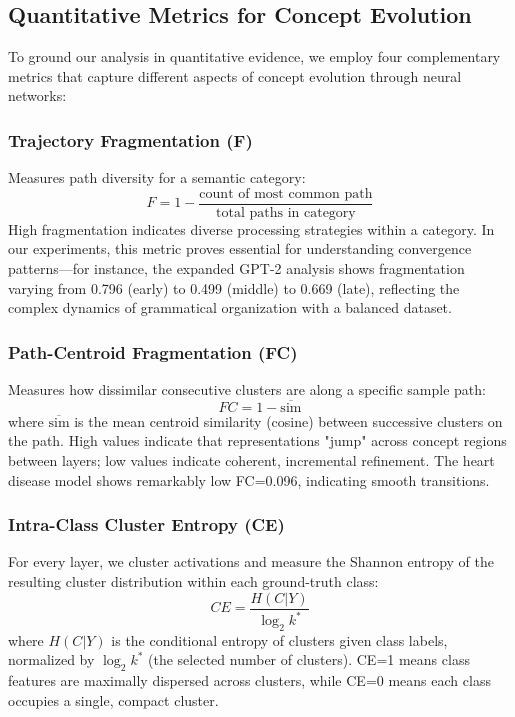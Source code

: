 \subsection{Quantitative Metrics for Concept Evolution}

To ground our analysis in quantitative evidence, we employ four complementary metrics that capture different aspects of concept evolution through neural networks:

\subsubsection{Trajectory Fragmentation (F)}
Measures path diversity for a semantic category:
$$F = 1 - \frac{\text{count of most common path}}{\text{total paths in category}}$$
High fragmentation indicates diverse processing strategies within a category. In our experiments, this metric proves essential for understanding convergence patterns—for instance, the expanded GPT-2 analysis shows fragmentation varying from 0.796 (early) to 0.499 (middle) to 0.669 (late), reflecting the complex dynamics of grammatical organization with a balanced dataset.

\subsubsection{Path-Centroid Fragmentation (FC)}
Measures how dissimilar consecutive clusters are along a specific sample path:
$$FC = 1 - \overline{\text{sim}}$$
where $\overline{\text{sim}}$ is the mean centroid similarity (cosine) between successive clusters on the path. High values indicate that representations "jump" across concept regions between layers; low values indicate coherent, incremental refinement. The heart disease model shows remarkably low FC=0.096, indicating smooth transitions.

\subsubsection{Intra-Class Cluster Entropy (CE)}
For every layer, we cluster activations and measure the Shannon entropy of the resulting cluster distribution within each ground-truth class:
$$CE = \frac{H(C|Y)}{\log_2 k^*}$$
where $H(C|Y)$ is the conditional entropy of clusters given class labels, normalized by $\log_2 k^*$ (the selected number of clusters). CE=1 means class features are maximally dispersed across clusters, while CE=0 means each class occupies a single, compact cluster.

